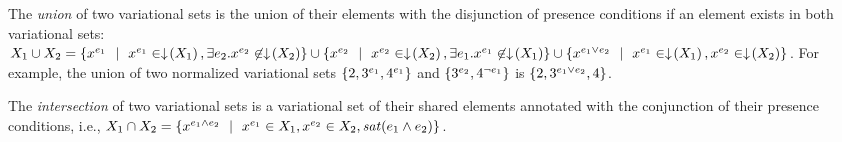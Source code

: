 



%
\begin{definition}
\label{def:vset-union}
The \emph {union} of two variational sets is the union of their elements with the disjunction of 
presence conditions if an element exists in both variational sets:
\ensuremath{
\vset_1 \cup \vset_2 = \setDef {\annot [\dimMeta_1] \elem \myOR \annot [\dimMeta_1] \elem \in \pushIn {\vset_1}, \exists \dimMeta_2. \annot [\dimMeta_2] \elem \not \in \pushIn{\vset_2}}
\cup \setDef {\annot [\dimMeta_2] \elem \myOR \annot [\dimMeta_2] \elem \in \pushIn {\vset_2}, 
\exists \dimMeta_1. \annot [\dimMeta_1] \elem  \not \in \pushIn {\vset_1}}
\cup \setDef {\annot [\dimMeta_1 \vee \dimMeta_2] \elem \myOR 
\annot [\dimMeta_1] \elem \in \pushIn {\vset_1}, \annot [\dimMeta_2] \elem \in \pushIn {\vset_2}}
}.
For example, the union of two normalized variational sets
\ensuremath{\setDef {2,\annot [\dimMeta_1] 3, \annot [\dimMeta_1] 4}} and 
\ensuremath{\setDef {\annot [\dimMeta_2] 3, \annot [\neg \dimMeta_1] 4}} is
\ensuremath{
 \setDef {2, \annot [\dimMeta_1 \vee \dimMeta_2] 3, 4}
}.
\end{definition}

% 
\begin{definition}
\label{def:vset-intersect}
The \emph{intersection} of two variational sets is a variational set of their shared elements
annotated with the conjunction of their presence conditions, i.e., 
\ensuremath{
\vset_1 \cap \vset_2 = \setDef {
\annot [\dimMeta_1 \wedge \dimMeta_2 ]\elem \myOR
\annot [\dimMeta_1] \elem \in \vset_1, \annot [\dimMeta_2] \elem \in \vset_2,
\sat {\dimMeta_1 \wedge \dimMeta_2}
}
}.
\end{definition}


